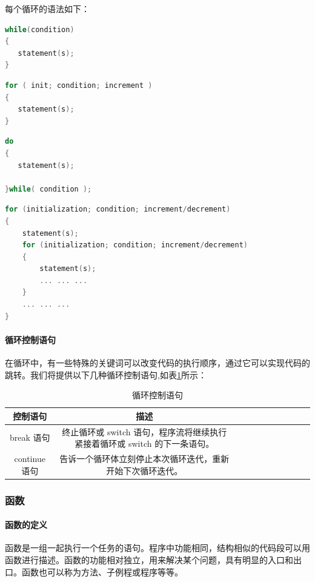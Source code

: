 \documentclass[UTF8,a4paper,10pt]{ctexart}
\begin{document}
每个循环的语法如下：


\begin{lstlisting}[title = while循环, language = c++]
while(condition)
{
   statement(s);
}
\end{lstlisting}


\begin{lstlisting}[title = for循环, language = c++]
for ( init; condition; increment )
{
   statement(s);
}
\end{lstlisting}

\begin{lstlisting}[title = do...while 循环, language = c++]
do
{
   statement(s);

}while( condition );
\end{lstlisting}


\begin{lstlisting}[title = 嵌套循环, language = c++]
for (initialization; condition; increment/decrement)
{
    statement(s);
    for (initialization; condition; increment/decrement)
    {
        statement(s);
        ... ... ...
    }
    ... ... ...
}
\end{lstlisting}

\paragraph{循环控制语句}
在循环中，有一些特殊的关键词可以改变代码的执行顺序，通过它可以实现代码的跳转。我们将提供以下几种循环控制语句,如表\ref{fig:3}所示：
\newpage
\begin{table}[!htbp]
  \centering
  \begin{tabular}{ccccccccccc}
  \toprule  
  控制语句& 描述&\\
  \midrule
  break 语句& 终止循环或 switch 语句，程序流将继续执行紧接着循环或 switch 的下一条语句。&\\
  continue 语句& 告诉一个循环体立刻停止本次循环迭代，重新开始下次循环迭代。&\\
  \bottomrule
  \end{tabular}
  \caption{循环控制语句}
  \label{fig:3}
\end{table}





\subsubsection{函数}

\paragraph{函数的定义}
函数是一组一起执行一个任务的语句。程序中功能相同，结构相似的代码段可以用函数进行描述。函数的功能相对独立，用来解决某个问题，具有明显的入口和出口。函数也可以称为方法、子例程或程序等等。
\end{document}
